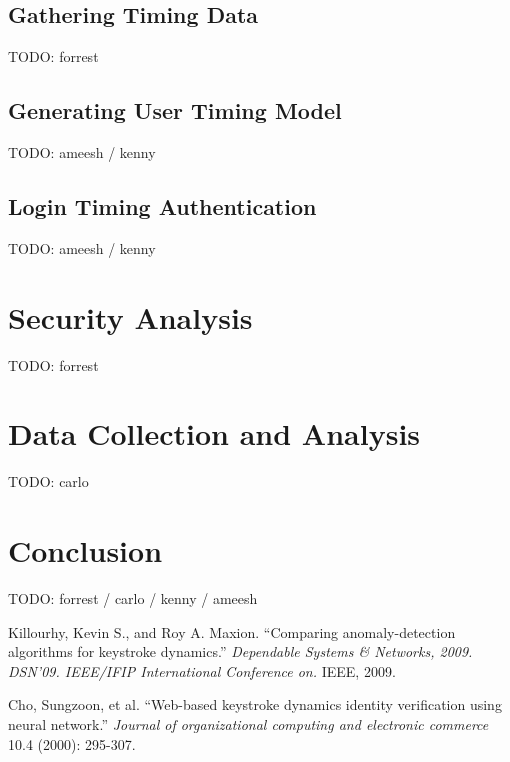 \documentclass{article}
\begin{document}
\subsection{Gathering Timing Data}
TODO: forrest

\subsection{Generating User Timing Model}
TODO: ameesh / kenny

\subsection{Login Timing Authentication}
TODO: ameesh / kenny

\section{Security Analysis}
TODO: forrest

\section{Data Collection and Analysis}
TODO: carlo

\section{Conclusion}
TODO: forrest / carlo / kenny / ameesh


\begin{thebibliography}{99}
   Killourhy, Kevin S., and Roy A. Maxion. 
   ``Comparing anomaly-detection algorithms for keystroke dynamics.''
   \textit{Dependable Systems \& Networks, 2009. DSN'09. IEEE/IFIP International Conference on.}
   IEEE, 2009. 
 
   Cho, Sungzoon, et al.
   ``Web-based keystroke dynamics identity verification using neural network.'' 
   \textit{Journal of organizational computing and electronic commerce}
   10.4 (2000): 295-307.
  
\end{thebibliography}
\end{document}
